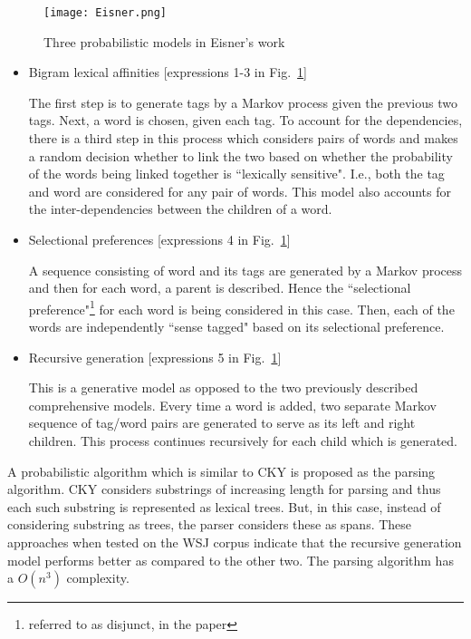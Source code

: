 \begin{figure}[!htb]
    \centering
    \texttt{[image: Eisner.png]}
    \centering
    \caption{Three probabilistic models in Eisner's work}
    \label{fig:eisnerexpressions}
\end{figure}

\begin{itemize}

\item Bigram lexical affinities [expressions 1-3 in Fig.~\ref{fig:eisnerexpressions}]

The first step is to generate tags by a Markov process given the previous two tags. Next, a word is chosen, given each tag. To account for the dependencies, there is a third step in this process which considers pairs of words and makes a random decision whether to link the two based on whether the probability of the words being linked together is ``lexically sensitive". I.e., both the tag and word are considered for any pair of words. This model also accounts for the inter-dependencies between the children of a word.

\item Selectional preferences [expressions 4 in Fig.~\ref{fig:eisnerexpressions}]

A sequence consisting of word and its tags are generated by a Markov process and then for each word, a parent is described. Hence the ``selectional preference"\footnote{referred to as disjunct, in the paper} for each word is being considered in this case. Then, each of the words are independently ``sense tagged" based on its selectional preference.

\item Recursive generation [expressions 5 in Fig.~\ref{fig:eisnerexpressions}]

This is a generative model as opposed to the two previously described comprehensive models. Every time a word is added, two separate Markov sequence of tag/word pairs are generated to serve as its left and right children. This process continues recursively for each child which is generated.

\end{itemize}

A probabilistic algorithm which is similar to CKY is proposed as the parsing algorithm. CKY considers substrings of increasing length for parsing and thus each such substring is represented as lexical trees. But, in this case, instead of considering substring as trees, the parser considers these as spans. These approaches when tested on the WSJ corpus indicate that the recursive generation model performs better as compared to the other two. The parsing algorithm has a $O(n^3)$ complexity. 

